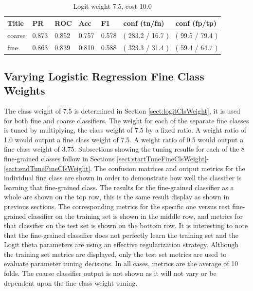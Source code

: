 \documentclass[ms]{nuthesis}
\begin{document}
\FloatBarrier
\begin{table}[H]
\centering
\caption{Logit weight 7.5, cost 10.0}
\label{tab:LogRegWt7p5-C10}
\begin{tabular}{|l||l||l||l||l||l||l|}\toprule
Title & PR & ROC & Acc & F1 & conf (tn/fn) & conf (fp/tp) \\ \midrule
coarse & 0.873 & 0.852 & 0.757 & 0.578 & ( 283.2 / 16.7 ) & ( 99.5 / 79.4 ) \\
fine & 0.863 & 0.839 & 0.810 & 0.588 & ( 323.3 / 31.4 ) & ( 59.4 / 64.7 ) \\ \bottomrule
\end{tabular}
\end{table}
\FloatBarrier



\subsection{Varying Logistic Regression Fine Class Weights}
\par The class weight of 7.5 is
determined in Section \ref{sect:logitClsWeight}, it is used for both fine and coarse classifiers.
The weight for each of the separate fine classes is tuned by multiplying,
the class weight of 7.5 by a fixed ratio. A
weight ratio of 1.0 would output a fine class weight of 7.5. A weight ratio of
 0.5 would output a fine class weight of 3.75. Subsections showing the tuning results
 for each of the 8 fine-grained classes follow in Sections
 \ref{sect:startTuneFineClsWeight}-\ref{sect:endTuneFineClsWeight}. The confusion matrices and
 output metrics for the individual
 fine class are shown in order to demonstrate how well the classifier is learning that
 fine-grained class. The results for the fine-grained classifier as a whole are shown on the top row, this is the same
 result display as shown in previous sections. The corresponding metrics for the specific one versus rest fine-grained
 classifier on the training set is shown in the middle row, and metrics for that classifier on the test set is shown
 on the bottom row. It is interesting to note that the fine-grained classifier does not perfectly learn the training
  set and the Logit theta parameters are using an effective regularization strategy. Although the training set metrics
  are displayed, only the test set metrics are used to evaluate parameter tuning decisions. In all cases,
  metrics are the average of 10 folds. The coarse classifier output
 is not shown as it will not vary or be dependent upon the fine class weight tuning.
\end{document}
